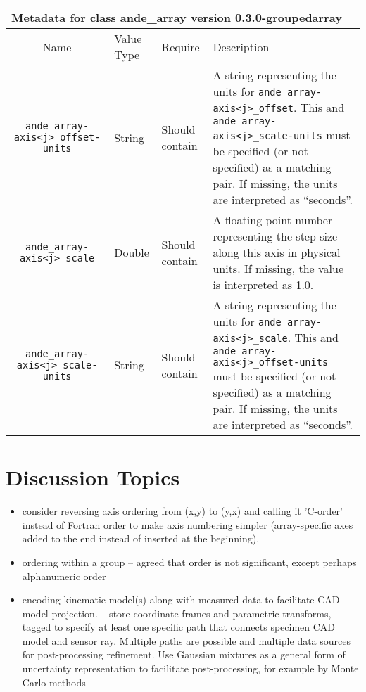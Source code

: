 \documentclass{article}
\newenvironment{AndeMetadata}[3]{
  
  \begin{tabular}{|c p{.4in} p{.5in} p{2.9in}|}
    \multicolumn{4}{l}{{\Large \bf Metadata for class #3}{\Large \ttfamily \fontseries{b} #1} version #2 }\\
    \hline
    Name & Value Type & Require & Description \\
    \hline
}{
  \hline
  \end{tabular}
}
\newcommand{\AndeMetadataLine}[4]{{\tt #1} & #2 & #3 & #4 \\}
\begin{document}
\begin{AndeMetadata}{ande\_array}{0.3.0-groupedarray}{}
{  }
  \AndeMetadataLine{ande\_array-axis<j>\_offset-units}{String}{Should contain}{
    A string representing the units for {\tt ande\_array-axis<j>\_offset}. This and {\tt ande\_array-axis<j>\_scale-units} must be specified (or not specified) as a matching pair. If missing, the units are interpreted as ``seconds''.
  }
  \AndeMetadataLine{ande\_array-axis<j>\_scale}{Double}{Should contain}{
    A floating point number representing the step size along this axis in physical units. If missing, the value is interpreted as 1.0.
  }
  \AndeMetadataLine{ande\_array-axis<j>\_scale-units}{String}{Should contain}{
    A string representing the units for {\tt ande\_array-axis<j>\_scale}. This and {\tt ande\_array-axis<j>\_offset-units} must be specified (or not specified) as a matching pair. If missing, the units are interpreted as ``seconds''.
  }
\end{AndeMetadata}

\section{Discussion Topics}
\begin{itemize}
\item consider reversing axis ordering from (x,y) to (y,x) and calling it 'C-order' instead of Fortran order to make axis numbering simpler (array-specific axes added to the end instead of inserted at the beginning). 
\item ordering within a group -- agreed that order is not significant, except perhaps alphanumeric order
\item encoding kinematic model(s) along with measured data to facilitate CAD model projection. -- store coordinate frames and parametric transforms, tagged to specify at least one specific path that connects specimen CAD model and sensor ray. Multiple paths are possible and multiple data sources for post-processing refinement. Use Gaussian mixtures as a general form of uncertainty representation to facilitate post-processing, for example by Monte Carlo methods
\end{itemize}
\end{document}
